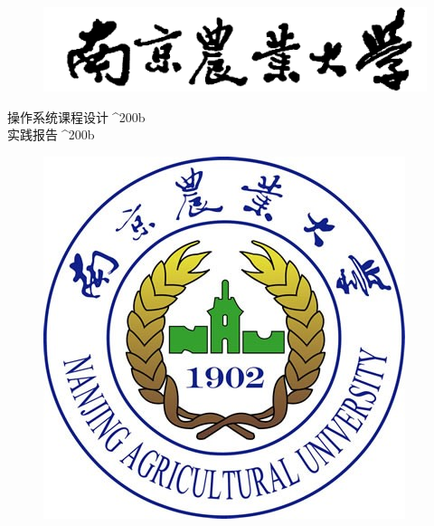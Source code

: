 \begin{figure}[!htbp]
	\centering
	\includegraphics[scale=0.11]{pic/top}
\end{figure}

\vspace{22.5pt}

\begin{center}
	{ {\fzyt 操作系统课程设计}}^^^^200b \\%
	{ {\fzyt 实践报告}}^^^^200b \\%

\end{center}

\vspace{42.8pt}

\begin{figure}[!htbp]
	\centering
	\includegraphics[scale=0.4244]{pic/logo}
\end{figure}

